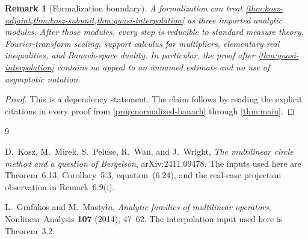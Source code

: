 \documentclass[11pt]{article}
\newtheorem{remark}[theorem]{Remark}
\begin{document}
\begin{remark}[Formalization boundary]\label{rem:formalization-boundary}
A formalization can treat \cref{thm:kosz-adjoint,thm:kosz-subunit,thm:quasi-interpolation} as three imported analytic modules.  After those modules, every step is reducible to standard measure theory, Fourier-transform scaling, support calculus for multipliers, elementary real inequalities, and Banach-space duality.  In particular, the proof after \cref{thm:quasi-interpolation} contains no appeal to an unnamed estimate and no use of asymptotic notation.
\end{remark}

\begin{proof}
This is a dependency statement.  The claim follows by reading the explicit citations in every proof from \cref{prop:normalized-banach} through \cref{thm:main}.
\end{proof}

\begin{thebibliography}{9}

D.~Kosz, M.~Mirek, S.~Peluse, R.~Wan, and J.~Wright,
\emph{The multilinear circle method and a question of Bergelson},
arXiv:2411.09478.
The inputs used here are Theorem~6.13, Corollary~5.3, equation~(6.24), and the real-case projection observation in Remark~6.9(i).

L.~Grafakos and M.~Masty\l o,
\emph{Analytic families of multilinear operators},
Nonlinear Analysis \textbf{107} (2014), 47--62.
The interpolation input used here is Theorem~3.2.

\end{thebibliography}
\end{document}
